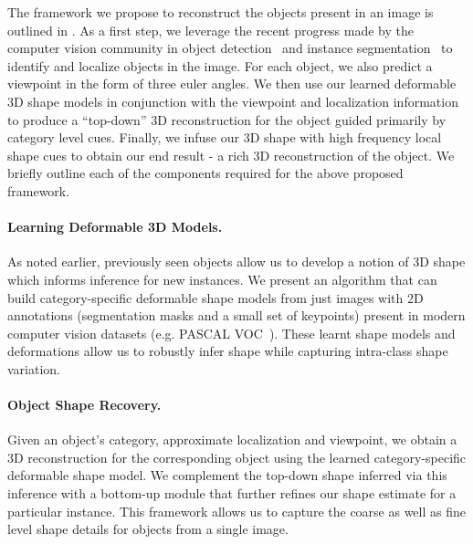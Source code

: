 The framework we propose to reconstruct the objects present in an image is outlined in . As a first step, we leverage the recent progress made by the computer vision community in object detection~\cite{girshick2013rich} and instance segmentation~\cite{BharathECCV2014, BharathCVPR2015} to identify and localize objects in the image. For each object, we also predict a viewpoint in the form of three euler angles. We then use our learned deformable 3D shape models in conjunction with the viewpoint and localization information to produce a ``top-down'' 3D reconstruction for the object guided primarily by category level cues. Finally, we infuse our 3D shape with high frequency local shape cues to obtain our end result - a rich 3D reconstruction of the object. We briefly outline each of the components required for the above proposed framework.

\paragraph{Learning Deformable 3D Models.}
As noted earlier, previously seen objects allow us to develop a notion of 3D shape which informs inference for new instances. We present an algorithm that can build category-specific  deformable shape models from just images with 2D annotations (segmentation masks and a small set of keypoints) present in modern computer vision datasets (e.g. PASCAL VOC~\cite{pascal-voc-2012}). These learnt shape models and deformations allow us to robustly infer shape while capturing intra-class shape variation.


\paragraph{Object Shape Recovery.}
Given an object's category, approximate localization and viewpoint, we obtain a 3D reconstruction for the corresponding object using the learned category-specific deformable shape model. We complement the top-down shape inferred via this inference with a bottom-up module that further refines our shape estimate for a particular instance. This framework allows us to capture the coarse as well as fine level shape details for objects from a single image.

